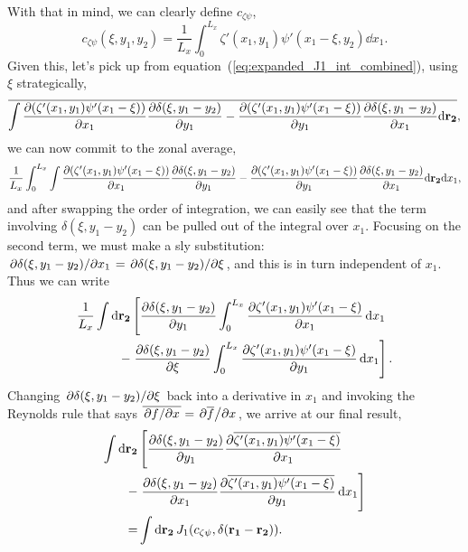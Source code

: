 \documentclass{paper}
\newcommand*{\mean}[1]{\overline{#1}}
\newcommand*{\zonal}[1]{\frac{1}{L_x} \int_0^{L_x} #1 \dd x_1}
\newcommand{\czp}{c_{\zeta\psi}}
\newcommand{\rr}[1]{\vb{r_{#1}}}
\newcommand{\Jac}[3][]{\pdv{#2}{x_{#1}}\pdv{#3}{y_{#1}} - \pdv{#2}{y_{#1}}\pdv{#3}{x_{#1}}}
\begin{document}
With that in mind, we can clearly define $\czp$,
\begin{equation}
  \label{eq:czp_def}
  \czp(\xi, y_1, y_2) = \zonal{\zeta'(x_1, y_1) \psi'(x_1 - \xi, y_2)}.
\end{equation}
Given this, let's pick up from equation~(\ref{eq:expanded_J1_int_combined}), using $\xi$ strategically,
\begin{equation}
  \label{eq:}
  \mean{\int{\Jac[1]{(\zeta'(x_1, y_1)\psi'(x_1- \xi))}{\delta(\xi, y_1- y_2) }\dd \rr2}},
\end{equation}
we can now commit to the zonal average,
\begin{equation}
  \label{eq:}
  \zonal{\int{\Jac[1]{(\zeta'(x_1, y_1)\psi'(x_1- \xi))}{\delta(\xi, y_1- y_2) }\dd \rr2}},
\end{equation}
and after swapping the order of integration, we can easily see that the term involving $\delta(\xi, y_1 - y_2)$ can be pulled out of the integral over $x_1$. Focusing on the second term, we must make a sly substitution: $\pdv*{\delta(\xi, y_1 - y_2)}{x_1} = \pdv*{\delta(\xi, y_1 - y_2)}{\xi}$, and this is in turn independent of $x_1$.  Thus we can write
\begin{equation}
  \label{eq:zonal_hack}
  \begin{split}
     \frac{1}{L_x} \int \dd{\rr2} & \left[\pdv{\delta(\xi, y_1 - y_2)}{y_1} \int_0^{L_x} \pdv{\zeta'(x_1, y_1)\psi'(x_1- \xi)}{x_1} \dd{x_1} \right.\\
      - &\left. \pdv{\delta(\xi, y_1 - y_2)}{\xi} \int_0^{L_x} \pdv{\zeta'(x_1, y_1)\psi'(x_1- \xi)}{y_1} \dd{x_1} \right].    
  \end{split}
\end{equation}
Changing $\pdv*{\delta(\xi, y_1 - y_2)}{\xi}$ back into a derivative in $x_1$ and invoking the Reynolds rule that says $\mean{\pdv*{f}{x}} = \pdv*{\mean{f}}{x}$, we arrive at our final result,
\begin{equation}
  \label{eq:zonal_hack_2}
  \begin{split}
    \int \dd{\rr2} & \left[\pdv{\delta(\xi, y_1 - y_2)}{y_1} \pdv{\mean{\zeta'(x_1, y_1)\psi'(x_1- \xi)}}{x_1} \right.\\
    - & \left.\pdv{\delta(\xi, y_1 - y_2)}{x_1} \pdv{\mean{\zeta'(x_1, y_1)\psi'(x_1- \xi)}}{y_1} \dd{x_1}\right]\\
     = &\int \dd{\rr2} J_1(\czp, \delta(\rr1 - \rr2)).
  \end{split}
\end{equation}
\end{document}
